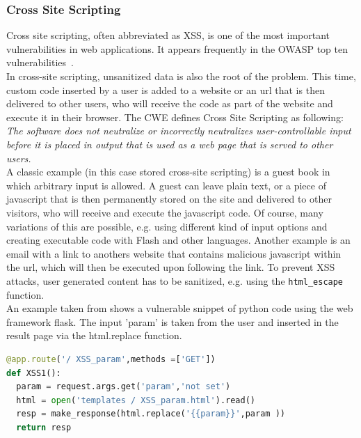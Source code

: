 \documentclass[
	a4paper,
	pagesize,
	pdftex,
	12pt,
	twoside, %
	BCOR=5mm, %
	ngerman,
	fleqn,
	final,
	]{scrartcl}
\begin{document}
\subsubsection{Cross Site Scripting}
Cross site scripting, often abbreviated as XSS, is one of the most important vulnerabilities in web applications. It appears frequently in the OWASP top ten vulnerabilities~\cite{OWASPFoundation.}.\\
In cross-site scripting, unsanitized data is also the root of the problem. This time, custom code inserted by a user is added to a website or an url that is then delivered to other users, who will receive the code as part of the website and execute it in their browser. The CWE defines Cross Site Scripting as following: \textit{The software does not neutralize or incorrectly neutralizes user-controllable input before it is placed in output that is used as a web page that is served to other users.}~\cite{CommonWeaknessEnumeration.19.09.2019}\\
A classic example (in this case stored cross-site scripting) is a guest book in which arbitrary input is allowed. A guest can leave plain text, or a piece of javascript that is then permanently stored on the site and delivered to other visitors, who will receive and execute the javascript code. Of course, many variations of this are possible, e.g. using different kind of input options and creating executable code with Flash and other languages. Another example is an email with a link to anothers website that contains malicious javascript within the url, which will then be executed upon following the link. 
To prevent XSS attacks, user generated content has to be sanitized, e.g. using the \texttt{html\_escape} function.\\
An example taken from \cite{Micheelsen.2016} shows a vulnerable snippet of python code using the web framework flask. The input 'param' is taken from the user and inserted in the result page via the html.replace function.
\begin{lstlisting}[language=Python, showstringspaces=False]
@app.route('/ XSS_param',methods =['GET'])
def XSS1():
  param = request.args.get('param','not set')
  html = open('templates / XSS_param.html').read()
  resp = make_response(html.replace('{{param}}',param ))
  return resp
\end{lstlisting}
\end{document}
